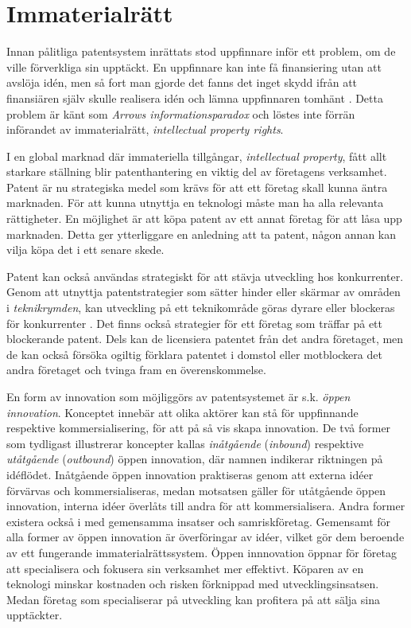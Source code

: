 \section{Immaterialrätt}
\label{sec:ip}

Innan pålitliga patentsystem inrättats stod uppfinnare inför ett problem, om de ville förverkliga sin upptäckt.
En uppfinnare kan inte få finansiering utan att avslöja idén, men så fort man gjorde det fanns det inget skydd ifrån att finansiären själv skulle realisera idén och lämna uppfinnaren tomhänt \cite{nard}.
Detta problem är känt som \emph{Arrows informationsparadox}\cite{arrow} och löstes inte förrän införandet av immaterialrätt, \emph{intellectual property rights}.

I en global marknad där immateriella tillgångar, \emph{intellectual property}, fått allt starkare ställning blir patenthantering en viktig del av företagens verksamhet.
Patent är nu strategiska medel som krävs för att ett företag skall kunna äntra marknaden.
För att kunna utnyttja en teknologi måste man ha alla relevanta rättigheter.
En möjlighet är att köpa patent av ett annat företag för att låsa upp marknaden.
Detta ger ytterliggare en anledning att ta patent, någon annan kan vilja köpa det i ett senare skede.

Patent kan också användas strategiskt för att stävja utveckling hos konkurrenter.
Genom att utnyttja patentstrategier som sätter hinder eller skärmar av områden i \emph{teknikrymden}, kan utveckling på ett teknikområde göras dyrare eller blockeras för konkurrenter \cite{ove}. Det finns också strategier för ett företag som träffar på ett blockerande patent. Dels kan de licensiera patentet från det andra företaget, men de kan också försöka ogiltig förklara patentet i domstol eller motblockera det andra företaget och tvinga fram en överenskommelse\cite{ove}. 

En form av innovation som möjliggörs av patentsystemet är s.k. \emph{öppen innovation}.
Konceptet innebär att olika aktörer kan stå för uppfinnande respektive kommersialisering, för att på så vis skapa innovation.
De två former som tydligast illustrerar koncepter kallas \emph{inåtgående} (\emph{inbound}) respektive \emph{utåtgående} (\emph{outbound}) öppen innovation, där namnen indikerar riktningen på idéflödet.
Inåtgående öppen innovation praktiseras genom att externa idéer förvärvas och kommersialiseras, medan motsatsen gäller för utåtgående öppen innovation, interna idéer överlåts till andra för att kommersialisera.
Andra former existera också i med gemensamma insatser och samriskföretag.
Gemensamt för alla former av öppen innovation är överföringar av idéer, vilket gör dem beroende av ett fungerande immaterialrättssystem.
Öppen innnovation öppnar för företag att specialisera och fokusera sin verksamhet mer effektivt.
Köparen av en teknologi minskar kostnaden och risken förknippad med utvecklingsinsatsen. 
Medan företag som specialiserar på utveckling kan profitera på att sälja sina upptäckter.
